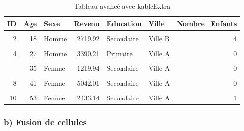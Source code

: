 \documentclass[
]{article}
\begin{document}
\begin{table}[!h]
\centering
\caption{\label{tab:tableau-avancé}Tableau avancé avec kableExtra}
\centering
\begin{tabular}[t]{rrlrllr}
\toprule
ID & Age & Sexe & Revenu & Education & Ville & Nombre\_Enfants\\
\midrule
\cellcolor{gray!10}{1} & \cellcolor{gray!10}{54} & \cellcolor{gray!10}{Homme} & \cellcolor{gray!10}{2443.58} & \cellcolor{gray!10}{Secondaire} & \cellcolor{gray!10}{Ville A} & \cellcolor{gray!10}{3}\\
2 & 18 & Homme & 2719.92 & Secondaire & Ville B & 4\\
\cellcolor{gray!10}{3} & \cellcolor{gray!10}{42} & \cellcolor{gray!10}{Femme} & \cellcolor{gray!10}{2848.79} & \cellcolor{gray!10}{Primaire} & \cellcolor{gray!10}{Ville A} & \cellcolor{gray!10}{0}\\
4 & 27 & Homme & 3390.21 & Primaire & Ville A & 0\\
\cellcolor{gray!10}{5} & \cellcolor{gray!10}{53} & \cellcolor{gray!10}{Femme} & \cellcolor{gray!10}{3890.67} & \cellcolor{gray!10}{Secondaire} & \cellcolor{gray!10}{Ville A} & \cellcolor{gray!10}{0}\\
\addlinespace
6 & 35 & Femme & 1219.94 & Secondaire & Ville A & 0\\
\cellcolor{gray!10}{7} & \cellcolor{gray!10}{64} & \cellcolor{gray!10}{Homme} & \cellcolor{gray!10}{4544.80} & \cellcolor{gray!10}{Secondaire} & \cellcolor{gray!10}{Ville B} & \cellcolor{gray!10}{0}\\
8 & 41 & Femme & 5042.01 & Secondaire & Ville A & 0\\
\cellcolor{gray!10}{9} & \cellcolor{gray!10}{24} & \cellcolor{gray!10}{Femme} & \cellcolor{gray!10}{2072.04} & \cellcolor{gray!10}{Primaire} & \cellcolor{gray!10}{Ville A} & \cellcolor{gray!10}{2}\\
10 & 53 & Femme & 2433.14 & Secondaire & Ville A & 1\\
\bottomrule
\end{tabular}
\end{table}

\hypertarget{b-fusion-de-cellules}{%
\subsubsection{b) Fusion de cellules}\label{b-fusion-de-cellules}}
\end{document}
